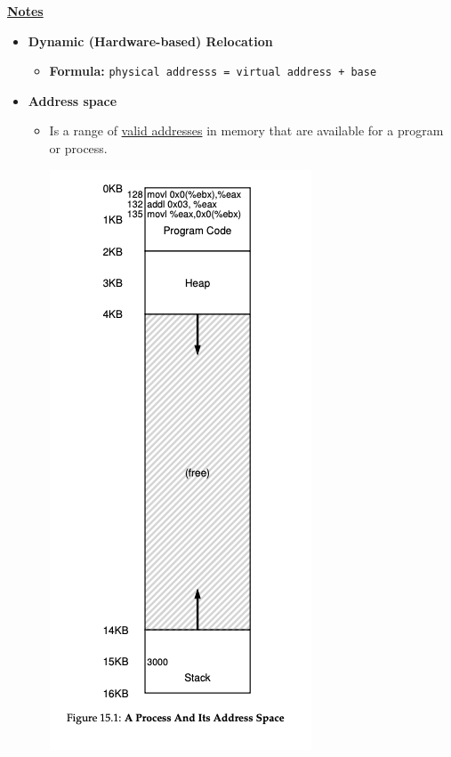 \documentclass[12pt]{article}
\begin{document}
\begin{enumerate}[1.]
\begin{mdframed}
    \end{mdframed}

    \underline{\textbf{Notes}}

    \begin{itemize}
        \item \textbf{Dynamic (Hardware-based) Relocation}

        \begin{itemize}
            \item \textbf{Formula:} \texttt{physical addresss = virtual address + base}
        \end{itemize}
        \item \textbf{Address space}

        \begin{itemize}
            \item Is a range of \underline{valid addresses} in memory that are available for
            a program or process.

            \bigskip

            \begin{center}
            \includegraphics[width=0.4\linewidth]{images/worksheet_7_solution_6.png}
            \end{center}


        \end{itemize}
    \end{itemize}


\end{enumerate}
\end{document}
